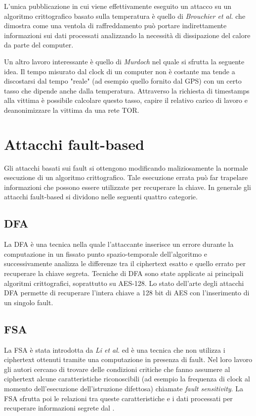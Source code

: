 		L'unica pubblicazione in cui viene effettivamente eseguito un attacco su un algoritmo crittografico basato sulla temperatura è quello di \emph{Brouchier et al.}\cite{brouchier2009temperature} che dimostra come una ventola di raffreddamento può portare indirettamente informazioni sui dati processati analizzando la necessità di dissipazione del calore da parte del computer.
		
		Un altro lavoro interessante è quello di \emph{Murdoch}\cite{murdoch2006hot} nel quale si sfrutta la seguente idea. Il tempo misurato dal clock di un computer non è costante ma tende a discostarsi dal tempo "reale" (ad esempio quello fornito dal \acs{GPS}) con un certo tasso che dipende anche dalla temperatura\cite{buracchi2015tri}. Attraverso la richiesta di timestamps alla vittima è possibile calcolare questo tasso, capire il relativo carico di lavoro e deanonimizzare la vittima da una rete \acs{TOR}.
		
	\section{Attacchi fault-based}
		Gli attacchi basati sui fault si ottengono modificando maliziosamente la normale esecuzione di un algoritmo crittografico. Tale esecuzione errata può far trapelare informazioni che possono essere utilizzate per recuperare la chiave. In generale gli attacchi fault-based si dividono nelle seguenti quattro categorie\cite{patranabis2018fault}.
		
		\subsection*{\ac{DFA}}
			La \ac{DFA} è una tecnica nella quale l'attaccante inserisce un errore durante la computazione in un fissato punto spazio-temporale dell'algoritmo e successivamente analizza le differenze tra il ciphertext esatto e quello errato per recuperare la chiave segreta. Tecniche di \ac{DFA} sono state applicate ai principali algoritmi crittografici, soprattutto su \ac{AES}-128. Lo stato dell'arte degli attacchi \ac{DFA} permette di recuperare l'intera chiave a 128 bit di \ac{AES} con l'inserimento di un singolo fault\cite{tunstall2011differential}.
			
		\subsection*{\ac{FSA}}
			La \ac{FSA} è stata introdotta da \emph{Li et al.}\cite{li2010fault} ed è una tecnica che non utilizza i ciphertext ottenuti tramite una computazione in presenza di fault. Nel loro lavoro gli autori cercano di trovare delle condizioni critiche che fanno assumere al ciphertext alcune caratteristiche riconoscibili (ad esempio la frequenza di clock al momento dell'esecuzione dell'istruzione difettosa) chiamate \emph{fault sensitivity}. La \ac{FSA} sfrutta poi le relazioni tra queste caratteristiche e i dati processati per recuperare informazioni segrete dal \disps.
			
